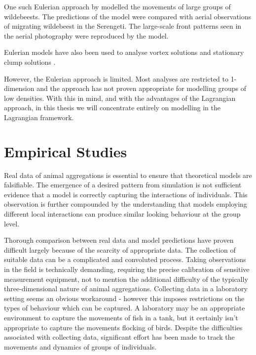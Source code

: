 One such Eulerian approach by \citet{gueron93} modelled the movements of large groups of wildebeests. The predictions of the model were compared with aerial observations of migrating wildebeest in the Serengeti. The large-scale front patterns seen in the aerial photography were reproduced by the model.

Eulerian models have also been used to analyse vortex solutions \citep{topaz04} and stationary clump solutions \citep{topaz06}.

However, the Eulerian approach is limited. Most analyses are restricted to 1-dimension and the approach has not proven appropriate for modelling groups of low densities. With this in mind, and with the advantages of the Lagrangian approach, in this thesis we will concentrate entirely on modelling in the Lagrangian framework.

\section{Empirical Studies}
\label{empirical_studies}

Real data of animal aggregations is essential to ensure that theoretical models are falsifiable. The emergence of a desired pattern from simulation is not sufficient evidence that a model is correctly capturing the interactions of individuals. This observation is further compounded by the understanding that models employing different local interactions can produce similar looking behaviour at the group level.

Thorough comparison between real data and model predictions have proven difficult largely because of the scarcity of appropriate data. The collection of suitable data can be a complicated and convoluted process. Taking observations in the field is technically demanding, requiring the precise calibration of sensitive measurement equipment, not to mention the additional difficulty of the typically three-dimensional nature of animal aggregations. Collecting data in a laboratory setting seems an obvious workaround - however this imposes restrictions on the types of behaviour which can be captured. A laboratory may be an appropriate environment to capture the movements of fish in a tank, but it certainly isn't appropriate to capture the movements flocking of birds. Despite the difficulties associated with collecting data, significant effort has been made to track the movements and dynamics of groups of individuals.

